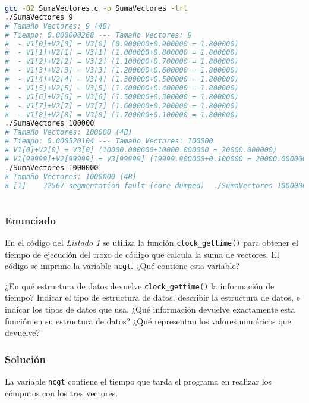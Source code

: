 \begin{lstlisting}[language=sh]
gcc -O2 SumaVectores.c -o SumaVectores -lrt
./SumaVectores 9
# Tamaño Vectores: 9 (4B)
# Tiempo: 0.000000268 --- Tamaño Vectores: 9
#  - V1[0]+V2[0] = V3[0] (0.900000+0.900000 = 1.800000)
#  - V1[1]+V2[1] = V3[1] (1.000000+0.800000 = 1.800000)
#  - V1[2]+V2[2] = V3[2] (1.100000+0.700000 = 1.800000)
#  - V1[3]+V2[3] = V3[3] (1.200000+0.600000 = 1.800000)
#  - V1[4]+V2[4] = V3[4] (1.300000+0.500000 = 1.800000)
#  - V1[5]+V2[5] = V3[5] (1.400000+0.400000 = 1.800000)
#  - V1[6]+V2[6] = V3[6] (1.500000+0.300000 = 1.800000)
#  - V1[7]+V2[7] = V3[7] (1.600000+0.200000 = 1.800000)
#  - V1[8]+V2[8] = V3[8] (1.700000+0.100000 = 1.800000)
./SumaVectores 100000
# Tamaño Vectores: 100000 (4B)
# Tiempo: 0.000520104 --- Tamaño Vectores: 100000
# V1[0]+V2[0] = V3[0] (10000.000000+10000.000000 = 20000.000000)
# V1[99999]+V2[99999] = V3[99999] (19999.900000+0.100000 = 20000.000000)
./SumaVectores 1000000
# Tamaño Vectores: 1000000 (4B)
# [1]    32567 segmentation fault (core dumped)  ./SumaVectores 1000000
\end{lstlisting}

\section{}\label{ej1-6}

\subsubsection{Enunciado}
En el código del \textit{Listado 1} se utiliza la función \texttt{clock\_gettime()} para obtener el tiempo de ejecución del trozo de código que calcula la suma de vectores.
El código se imprime la variable \texttt{ncgt}.
¿Qué contiene esta variable?

¿En qué estructura de datos devuelve \texttt{clock\_gettime()} la información de tiempo?
Indicar el tipo de estructura de datos, describir la estructura de datos, e indicar los tipos de datos que usa.
¿Qué información devuelve exactamente esta función en su estructura de datos?
¿Qué representan los valores numéricos que devuelve?

\subsubsection{Solución}

La variable \texttt{ncgt} contiene el tiempo que tarda el programa en realizar los cómputos con los tres vectores.

